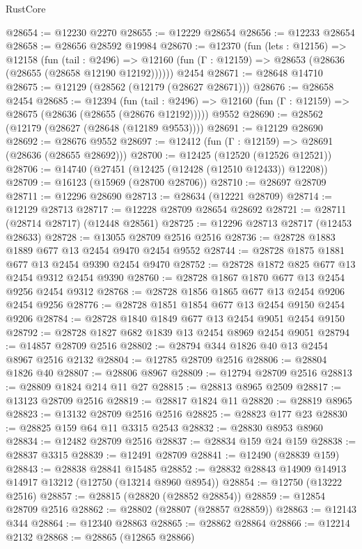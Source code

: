\begin{lexlean}{RustCore}
\begin{coremodule}
@28654 := @12230 @2270
@28655 := @12229 @28654
@28656 := @12233 @28654
@28658 := @28656 @28592 @19984
@28670 := @12370
    (fun (lets : @12156) =>
    @12158
      (fun (tail : @2496) =>
      @12160 (fun (Γ : @12159) => @28653 (@28636 (@28655 (@28658 @12190 @12192))))))
    @2454
@28671 := @28648 @14710
@28675 := @12129 (@28562 (@12179 (@28627 @28671)))
@28676 := @28658 @2454
@28685 := @12394
    (fun (tail : @2496) => @12160 (fun (Γ : @12159) => @28675 (@28636 (@28655 (@28676 @12192)))))
    @9552
@28690 := @28562 (@12179 (@28627 (@28648 (@12189 @9553))))
@28691 := @12129 @28690
@28692 := @28676 @9552
@28697 := @12412 (fun (Γ : @12159) => @28691 (@28636 (@28655 @28692)))
@28700 := @12425 (@12520 (@12526 @12521))
@28706 := @14740 (@27451 (@12425 (@12428 (@12510 @12433)) @12208))
@28709 := @16123 (@15969 (@28700 @28706))
@28710 := @28697 @28709
@28711 := @12296 @28690
@28713 := @28634 (@12221 @28709)
@28714 := @12129 @28713
@28717 := @12228 @28709 @28654 @28692
@28721 := @28711 (@28714 @28717) (@12448 @28561)
@28725 := @12296 @28713 @28717 (@12453 @28633)
@28728 := @13055 @28709 @2516 @2516
@28736 := @28728 @1883 @1889 @677 @13 @2454 @9470 @2454 @9552
@28744 := @28728 @1875 @1881 @677 @13 @2454 @9390 @2454 @9470
@28752 := @28728 @1872 @825 @677 @13 @2454 @9312 @2454 @9390
@28760 := @28728 @1867 @1870 @677 @13 @2454 @9256 @2454 @9312
@28768 := @28728 @1856 @1865 @677 @13 @2454 @9206 @2454 @9256
@28776 := @28728 @1851 @1854 @677 @13 @2454 @9150 @2454 @9206
@28784 := @28728 @1840 @1849 @677 @13 @2454 @9051 @2454 @9150
@28792 := @28728 @1827 @682 @1839 @13 @2454 @8969 @2454 @9051
@28794 := @14857 @28709 @2516
@28802 := @28794 @344 @1826 @40 @13 @2454 @8967 @2516 @2132
@28804 := @12785 @28709 @2516
@28806 := @28804 @1826 @40
@28807 := @28806 @8967
@28809 := @12794 @28709 @2516
@28813 := @28809 @1824 @214 @11 @27
@28815 := @28813 @8965 @2509
@28817 := @13123 @28709 @2516
@28819 := @28817 @1824 @11
@28820 := @28819 @8965
@28823 := @13132 @28709 @2516 @2516
@28825 := @28823 @177 @23
@28830 := @28825 @159 @64 @11 @3315 @2543
@28832 := @28830 @8953 @8960
@28834 := @12482 @28709 @2516
@28837 := @28834 @159 @24 @159
@28838 := @28837 @3315
@28839 := @12491 @28709
@28841 := @12490 (@28839 @159)
@28843 := @28838 @28841 @15485
@28852 := @28832 @28843 @14909 @14913 @14917 @13212 (@12750 (@13214 @8960 @8954))
@28854 := @12750 (@13222 @2516)
@28857 := @28815 (@28820 (@28852 @28854))
@28859 := @12854 @28709 @2516
@28862 := @28802 (@28807 (@28857 @28859))
@28863 := @12143 @344
@28864 := @12340 @28863
@28865 := @28862 @28864
@28866 := @12214 @2132
@28868 := @28865 (@12865 @28866)

\end{coremodule}
\end{lexlean}
